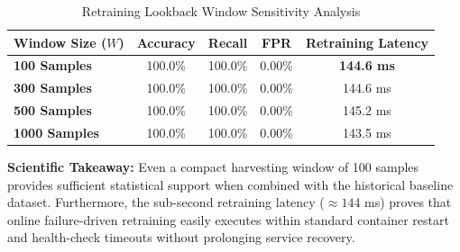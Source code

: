 \documentclass[12pt,a4paper,oneside]{report}
\begin{document}
\begin{table}[H]
\caption{Retraining Lookback Window Sensitivity Analysis}
\centering
\begin{tabularx}{\columnwidth}{X c c c c}
\toprule
\textbf{Window Size ($W$)} & \textbf{Accuracy} & \textbf{Recall} & \textbf{FPR} & \textbf{Retraining Latency} \\
\midrule
\textbf{100 Samples}  & 100.0\% & 100.0\% & 0.00\% & \textbf{144.6 ms} \\
\textbf{300 Samples}  & 100.0\% & 100.0\% & 0.00\% & 144.6 ms \\
\textbf{500 Samples}  & 100.0\% & 100.0\% & 0.00\% & 145.2 ms \\
\textbf{1000 Samples} & 100.0\% & 100.0\% & 0.00\% & 143.5 ms \\
\bottomrule
\end{tabularx}
\label{tab:window_sens}
\end{table}

\noindent \textbf{Scientific Takeaway:} Even a compact harvesting window of 100 samples provides sufficient statistical support when combined with the historical baseline dataset. Furthermore, the sub-second retraining latency ($\approx 144$ ms) proves that online failure-driven retraining easily executes within standard container restart and health-check timeouts without prolonging service recovery.
\end{document}
